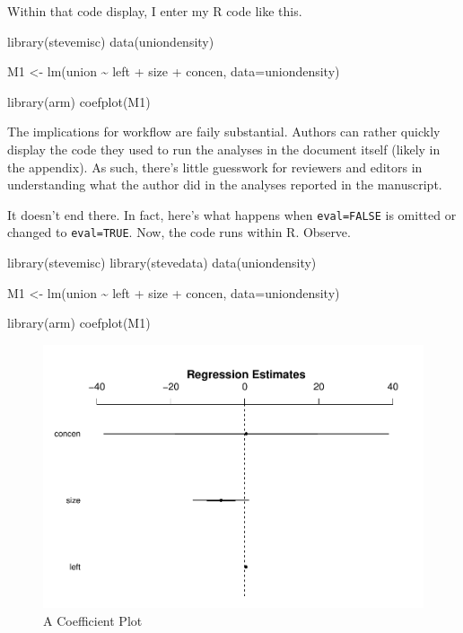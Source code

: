 \documentclass[11pt,]{article}
\newenvironment{Shaded}{\begin{snugshade}}{\end{snugshade}}
\newcommand{\AttributeTok}[1]{\textcolor[rgb]{0.77,0.63,0.00}{#1}}
\newcommand{\FunctionTok}[1]{\textcolor[rgb]{0.00,0.00,0.00}{#1}}
\newcommand{\NormalTok}[1]{#1}
\newcommand{\OtherTok}[1]{\textcolor[rgb]{0.56,0.35,0.01}{#1}}
\newcommand{\SpecialCharTok}[1]{\textcolor[rgb]{0.00,0.00,0.00}{#1}}
\begin{document}
Within that code display, I enter my R code like this.

\begin{Shaded}
\begin{Highlighting}[]
\FunctionTok{library}\NormalTok{(stevemisc)}
\FunctionTok{data}\NormalTok{(uniondensity)}

\NormalTok{M1 }\OtherTok{\textless{}{-}} \FunctionTok{lm}\NormalTok{(union }\SpecialCharTok{\textasciitilde{}}\NormalTok{ left }\SpecialCharTok{+}\NormalTok{ size }\SpecialCharTok{+}\NormalTok{ concen, }\AttributeTok{data=}\NormalTok{uniondensity)}

\FunctionTok{library}\NormalTok{(arm)}
\FunctionTok{coefplot}\NormalTok{(M1)}
\end{Highlighting}
\end{Shaded}

The implications for workflow are faily substantial. Authors can rather
quickly display the code they used to run the analyses in the document
itself (likely in the appendix). As such, there's little guesswork for
reviewers and editors in understanding what the author did in the
analyses reported in the manuscript.

It doesn't end there. In fact, here's what happens when
\texttt{eval=FALSE} is omitted or changed to \texttt{eval=TRUE}. Now,
the code runs within R. Observe.

\begin{Shaded}
\begin{Highlighting}[]
\FunctionTok{library}\NormalTok{(stevemisc)}
\FunctionTok{library}\NormalTok{(stevedata)}
\FunctionTok{data}\NormalTok{(uniondensity)}

\NormalTok{M1 }\OtherTok{\textless{}{-}} \FunctionTok{lm}\NormalTok{(union }\SpecialCharTok{\textasciitilde{}}\NormalTok{ left }\SpecialCharTok{+}\NormalTok{ size }\SpecialCharTok{+}\NormalTok{ concen, }\AttributeTok{data=}\NormalTok{uniondensity)}

\FunctionTok{library}\NormalTok{(arm)}
\FunctionTok{coefplot}\NormalTok{(M1)}
\end{Highlighting}
\end{Shaded}

\begin{figure}
\centering
\includegraphics{figs/unnamed-chunk-3.pdf}
\caption{A Coefficient Plot}
\end{figure}
\end{document}

